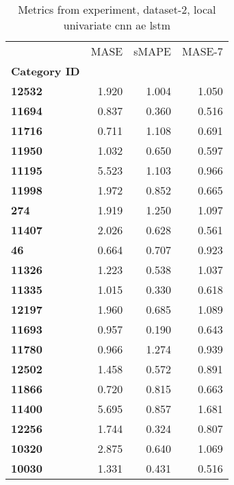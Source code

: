 \begin{table}[h]
\centering
\caption{Metrics from experiment, dataset-2, local univariate cnn ae lstm}
\label{table:local-univariate-cnn-ae-lstm-dataset-2}
\begin{tabular}{lrrr}
\toprule
{} &   MASE &  sMAPE &  MASE-7 \\
\textbf{Category ID} &        &        &         \\
\midrule
\textbf{12532      } &  1.920 &  1.004 &   1.050 \\
\textbf{11694      } &  0.837 &  0.360 &   0.516 \\
\textbf{11716      } &  0.711 &  1.108 &   0.691 \\
\textbf{11950      } &  1.032 &  0.650 &   0.597 \\
\textbf{11195      } &  5.523 &  1.103 &   0.966 \\
\textbf{11998      } &  1.972 &  0.852 &   0.665 \\
\textbf{274        } &  1.919 &  1.250 &   1.097 \\
\textbf{11407      } &  2.026 &  0.628 &   0.561 \\
\textbf{46         } &  0.664 &  0.707 &   0.923 \\
\textbf{11326      } &  1.223 &  0.538 &   1.037 \\
\textbf{11335      } &  1.015 &  0.330 &   0.618 \\
\textbf{12197      } &  1.960 &  0.685 &   1.089 \\
\textbf{11693      } &  0.957 &  0.190 &   0.643 \\
\textbf{11780      } &  0.966 &  1.274 &   0.939 \\
\textbf{12502      } &  1.458 &  0.572 &   0.891 \\
\textbf{11866      } &  0.720 &  0.815 &   0.663 \\
\textbf{11400      } &  5.695 &  0.857 &   1.681 \\
\textbf{12256      } &  1.744 &  0.324 &   0.807 \\
\textbf{10320      } &  2.875 &  0.640 &   1.069 \\
\textbf{10030      } &  1.331 &  0.431 &   0.516 \\
\bottomrule
\end{tabular}
\end{table}

